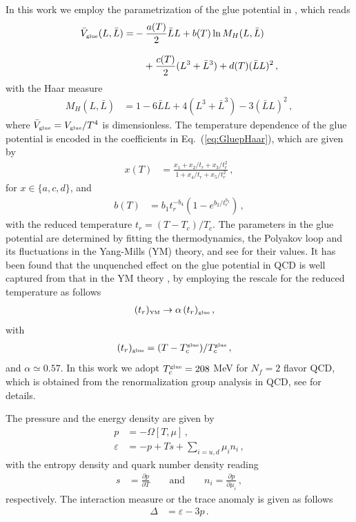 \documentclass[%
reprint,
superscriptaddress,
showpacs,preprintnumbers,
 amsmath,amssymb,
 aps,
prd,
]{revtex4-1}
\def\Eq#1{Eq.~(\ref{#1})}
\begin{document}
In this work we employ the parametrization of the glue potential in \cite{Lo:2013hla}, which reads 
\begin{align}
  \bar V_{\text{\tiny{glue}}}(L,\bar L)=& -\frac{a(T)}{2} \bar L L + b(T)\ln M_H(L,\bar{L})\nonumber \\[2ex]
  &\quad + \frac{c(T)}{2} (L^3+\bar L^3) + d(T) (\bar{L} L)^2\,,\label{eq:GluepHaar}
\end{align}
with the Haar measure 
\begin{align}
M_H (L, \bar{L})&= 1 -6 \bar{L}L + 4 (L^3+\bar{L}^3) - 3  (\bar{L}L)^2\,,
\end{align}
where $\bar V_{\text{\tiny{glue}}}=V_{\text{\tiny{glue}}}/T^4$ is dimensionless. The temperature dependence of the glue potential is encoded in the coefficients in \Eq{eq:GluepHaar}, which are given by
\begin{align}
  x(T) &= \frac{x_1 + x_2/t_r + x_3/t_r^2}{1 + x_4/t_r + x_5/t_r^2}\,,\label{eq:xT}
\end{align}
for $x\in \{a, c, d\}$, and 
\begin{align}
  b(T) &=b_1 t_r^{-b_4} (1 -e^{b_2/t_r^{b_3}} )\,,\label{eq:bT}
\end{align}
with the reduced temperature $t_r=(T-T_c)/T_c$. The parameters in the glue potential are determined by fitting the thermodynamics, the Polyakov loop and its fluctuations in the Yang-Mills (YM) theory, and see  \cite{Lo:2013hla} for their values. It has been found that the unquenched effect on the glue potential in QCD is well captured from that in the YM theory \cite{Haas:2013qwp}, by employing the rescale for the reduced temperature as follows
\begin{align}
  (t_r)_{\text{\tiny{YM}}}&\rightarrow \alpha\,(t_r)_{\text{\tiny{glue}}}\,,\label{}
\end{align}
with
\begin{align}
  (t_r)_{\text{\tiny{glue}}}&=(T-T_c^\text{\tiny{glue}})/T_c^\text{\tiny{glue}}\,,\label{}
\end{align}
and $\alpha \simeq 0.57$. In this work we adopt $T_c^\text{\tiny{glue}}=208$ MeV for $N_f=2$ flavor QCD, which is obtained from the renormalization group analysis in QCD, see \cite{Schaefer:2007pw} for details.

The pressure and the energy density are given by
\begin{align}
  p&=-\Omega[T,\mu]\,,\\[2ex]
 \varepsilon&=-p+Ts +\sum_{i=u,d}\mu_i n_i\,,\label{}
\end{align}
with the entropy density and quark number density reading 
\begin{align}
  s&=\frac{\partial p}{\partial T}\qquad \text{and}\qquad n_i=\frac{\partial p}{\partial \mu_i}\,,\label{}
\end{align}
respectively. The interaction measure or the trace anomaly is given as follows
\begin{align}
  \Delta&=\varepsilon-3p\,.\label{}
\end{align}
\end{document}

